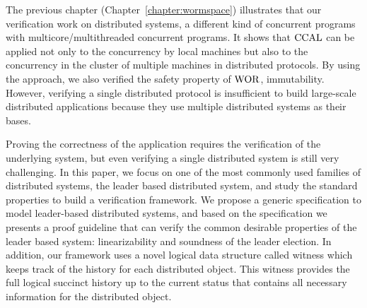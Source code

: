 
The previous chapter (Chapter~\ref{chapter:wormspace}) illustrates that our verification work on distributed systems, 
a different kind of concurrent programs with multicore/multithreaded concurrent programs. 
It shows 
that $\mathrm{CCAL}$ can be applied not only to the concurrency by local machines
but also to the concurrency in the cluster of multiple machines in distributed protocols. 
By using the approach, we also verified the safety property of $\mathrm{WOR}$, immutability. 
However, verifying a single distributed protocol is insufficient to build large-scale distributed applications because they use multiple distributed systems as their bases.

Proving the correctness of the application requires the verification of the underlying system, but even verifying a single distributed system is
still very challenging. In this paper, we focus on one of the most commonly
used families of distributed systems, the leader based distributed system, and study the standard properties to build a verification framework.
We propose a generic specification to model leader-based distributed systems, and based on
the specification we presents a proof guideline that can verify the common
desirable properties of the leader based system: linearizability and soundness of
the leader election. 
In addition, our framework uses a novel logical data structure called witness which keeps track of the history for each distributed object.
This witness provides the full logical succinct history up to the current status that contains all necessary information for the distributed object. 



%
